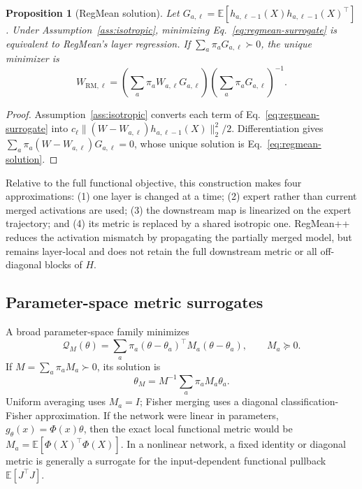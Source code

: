 \documentclass[letterpaper]{article} %
\theoremstyle{plain}
\newtheorem{proposition}[theorem]{Proposition}
\theoremstyle{definition}
\begin{document}
\begin{proposition}[RegMean solution]
\label{prop:regmean-formal}
Let
$G_{a,\ell}=\mathbb E[h_{a,\ell-1}(X)h_{a,\ell-1}(X)^\top]$.
Under Assumption~\ref{ass:isotropic}, minimizing
Eq.~\eqref{eq:regmean-surrogate} is equivalent to RegMean's layer regression. If
$\sum_a\pi_aG_{a,\ell}\succ0$, the unique minimizer is
\begin{equation}
W_{\mathrm{RM},\ell}
=\left(\sum_a\pi_aW_{a,\ell}G_{a,\ell}\right)
 \left(\sum_a\pi_aG_{a,\ell}\right)^{-1}.
\label{eq:regmean-solution}
\end{equation}
\end{proposition}

\begin{proof}
Assumption~\ref{ass:isotropic} converts each term of
Eq.~\eqref{eq:regmean-surrogate} into
$c_\ell\|(W-W_{a,\ell})h_{a,\ell-1}(X)\|_2^2/2$.
Differentiation gives
$\sum_a\pi_a(W-W_{a,\ell})G_{a,\ell}=0$, whose unique solution is
Eq.~\eqref{eq:regmean-solution}.
\end{proof}

Relative to the full functional objective, this construction makes four approximations:
(1) one layer is changed at a time; (2) expert rather than current merged activations are
used; (3) the downstream map is linearized on the expert trajectory; and (4) its metric
is replaced by a shared isotropic one. RegMean++ reduces the activation mismatch by
propagating the partially merged model, but remains layer-local and does not retain the
full downstream metric or all off-diagonal blocks of $H$.

\subsection{Parameter-space metric surrogates}
\label{app:parameter-metrics}

A broad parameter-space family minimizes
\begin{equation}
\mathcal Q_M(\theta)=
\sum_a\pi_a(\theta-\theta_a)^\top M_a(\theta-\theta_a),
\qquad M_a\succeq0.
\label{eq:parameter-metric}
\end{equation}
If $M=\sum_a\pi_aM_a\succ0$, its solution is
\begin{equation}
\theta_M=M^{-1}\sum_a\pi_aM_a\theta_a.
\label{eq:parameter-metric-solution}
\end{equation}
Uniform averaging uses $M_a=I$; Fisher merging uses a diagonal classification-Fisher
approximation. If the network were linear in parameters,
$g_\theta(x)=\Phi(x)\theta$, then the exact local functional metric would be
$M_a=\mathbb E[\Phi(X)^\top\Phi(X)]$. In a nonlinear network, a fixed identity or
diagonal metric is generally a surrogate for the input-dependent functional pullback
$\mathbb E[J^\top J]$.
\end{document}

